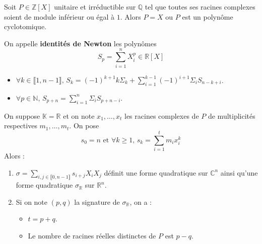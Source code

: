  \begin{corollary}
    Soit $P \in \mathbb{Z}[X]$ unitaire et irréductible sur $\mathbb{Q}$ tel que toutes ses racines complexes soient de module inférieur ou égal à $1$. Alors $P = X$ ou $P$ est un polynôme cyclotomique.
  \end{corollary}


  \begin{definition}
    On appelle \textbf{identités de Newton} les polynômes
    \[ S_p = \sum_{i=1}^n X_i^p \in \mathbb{R}[X] \]
  \end{definition}

  \begin{proposition}
    \begin{itemize}
      \item $\forall k \in \llbracket 1, n-1 \rrbracket, \, S_k = (-1)^{k+1} k \Sigma_k + \sum_{i=1}^{k-1} (-1)^{i+1} \Sigma_i S_{n-k+i}$.
      \item $\forall p \in \mathbb{N}, \, S_{p+n} = \sum_{i=1}^n \Sigma_i S_{p+n-i}$.
    \end{itemize}
  \end{proposition}


  \begin{application}
    On suppose $\mathbb{K} = \mathbb{R}$ et on note $x_1, \dots, x_t$ les racines complexes de $P$ de multiplicités respectives $m_1, \dots, m_t$. On pose
    \[ s_0 = n \text{ et } \forall k \geq 1, \, s_k = \sum_{i=1}^t m_i x_i^k \]
    Alors :
    \begin{enumerate}[label=(\roman*)]
      \item $\sigma = \sum_{i, j \in \llbracket 0, n-1 \rrbracket} s_{i+j} X_i X_j$ définit une forme quadratique sur $\mathbb{C}^n$ ainsi qu'une forme quadratique $\sigma_{\mathbb{R}}$ sur $\mathbb{R}^n$.
      \item Si on note $(p,q)$ la signature de $\sigma_{\mathbb{R}}$, on a :
      \begin{itemize}
        \item $t = p + q$.
        \item Le nombre de racines réelles distinctes de $P$ est $p-q$.
      \end{itemize}
    \end{enumerate}
  \end{application}

